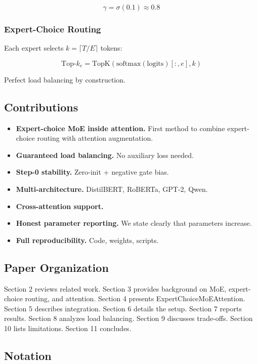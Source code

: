 \[
\gamma = \sigma(0.1) \approx 0.8
\tag{1.5}
\]

\subsubsection{Expert-Choice Routing}

Each expert selects $k = \lceil T / E \rceil$ tokens:

\[
\text{Top-}k_e = \text{TopK}\!\left(\text{softmax}(\text{logits})[:, e], k\right)
\tag{1.6}
\]

Perfect load balancing by construction.

\subsection{Contributions}

\begin{itemize}
\item \textbf{Expert-choice MoE inside attention.} First method to combine expert-
  choice routing with attention augmentation.
\item \textbf{Guaranteed load balancing.} No auxiliary loss needed.
\item \textbf{Step-0 stability.} Zero-init + negative gate bias.
\item \textbf{Multi-architecture.} DistilBERT, RoBERTa, GPT-2, Qwen.
\item \textbf{Cross-attention support.}
\item \textbf{Honest parameter reporting.} We state clearly that parameters increase.
\item \textbf{Full reproducibility.} Code, weights, scripts.

\end{itemize}
\subsection{Paper Organization}

Section 2 reviews related work. Section 3 provides background on MoE, 
expert-choice routing, and attention. Section 4 presents 
ExpertChoiceMoEAttention. Section 5 describes integration. Section 6 details 
the setup. Section 7 reports results. Section 8 analyzes load balancing. 
Section 9 discusses trade-offs. Section 10 lists limitations. Section 11 
concludes.



\subsection{Notation}

